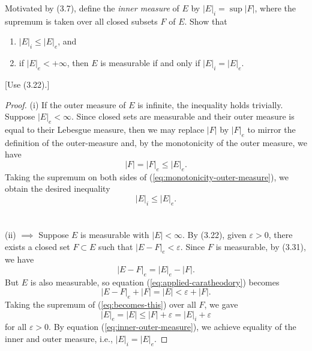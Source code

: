 \begin{problem}
Motivated by (3.7), define the \emph{inner measure} of $E$ by
$\left|E\right|_i=\sup\left|F\right|$, where the supremum is taken over all
closed subsets $F$ of $E$. Show that
\begin{enumerate}[label=(\roman*)]
\item $\left|E\right|_i\leq\left|E\right|_e$, and
\item if $\left|E\right|_e<+\infty$, then $E$ is measurable if and only if
  $\left|E\right|_i=\left|E\right|_e$.
\end{enumerate}
[Use (3.22).]
\end{problem}
\begin{proof}
(i) If the outer measure of $E$ is infinite, the inequality holds
trivially. Suppose $|E|_e<\infty$. Since closed sets are measurable and
their outer measure is equal to their Lebesgue measure, then we may replace
$\left|F\right|$ by $\left|F\right|_e$ to mirror the definition of the
outer-measure and, by the monotonicity of the outer measure, we have
\begin{equation}
\label{eq:monotonicity-outer-measure}
\left|F\right|=\left|F\right|_e\leq\left|E\right|_e.
\end{equation}
Taking the supremum on both sides of (\ref{eq:monotonicity-outer-measure}),
we obtain the desired inequality
\begin{equation}
\label{eq:inner-outer-measure}
\left|E\right|_i\leq\left|E\right|_e.
\end{equation}
\\\\
(ii) $\implies$ Suppose $E$ is measurable with
$\left|E\right|<\infty$. By (3.22), given $\varepsilon>0$, there exists a
closed set $F\subset E$ such that $\left|E\minus
  F\right|_e<\varepsilon$. Since $F$ is measurable, by (3.31), we have
\begin{equation}
\label{eq:applied-caratheodory}
\left|E\minus F\right|_e=\left|E\right|_e-\left|F\right|.
\end{equation}
But $E$ is also measurable, so equation (\ref{eq:applied-caratheodory})
becomes
\begin{equation}
  \label{eq:becomes-this}
\left|E\minus F\right|_e+\left|F\right|=\left|E\right|<\varepsilon+\left|F\right|.
\end{equation}
Taking the supremum of (\ref{eq:becomes-this}) over all $F$, we gave
\[
\left|E\right|_e=\left|E\right|\leq \left|F\right|+\varepsilon=\left|E\right|_i+\varepsilon
\]
for all $\varepsilon>0$. By equation (\ref{eq:inner-outer-measure}), we
achieve equality of the inner and outer measure, i.e.,
$\left|E\right|_i=\left|E\right|_e$.


\end{proof}
